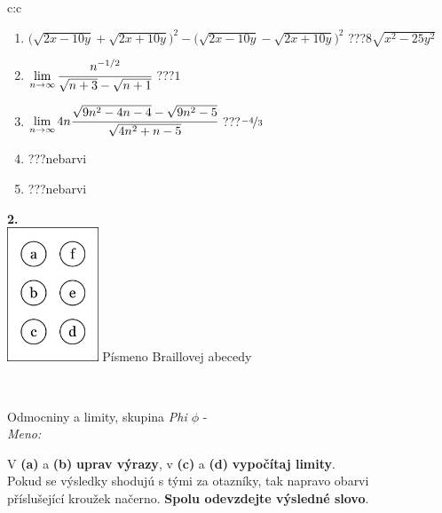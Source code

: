 \documentclass[10pt]{report}
\begin{document}
\begin{tabular}{c:c}
\begin{minipage}[c][104.5mm][t]{0.5\linewidth}
\begin{center}
\begin{minipage}{0.79\linewidth}
\begin{center}
\begin{varwidth}{\linewidth}
\begin{enumerate}
\item {\footnotesize{\scriptsize$\big(\sqrt{2x-10y}+\sqrt{2x+10y}\big)^2-\big(\sqrt{2x-10y}-\sqrt{2x+10y}\big)^2$}\quad \dotfill\; ???\;\dotfill \quad $8\sqrt{x^2-25y^2}$}
\item $\lim\limits_{n\to\infty}\cfrac{n^{-1/2}}{\sqrt{n+3}-\sqrt{n+1}}$\quad \dotfill\; ???\;\dotfill \quad $1$
\item $\lim\limits_{n\to\infty}4n\cfrac{\sqrt{9n^2-4n-4}-\sqrt{9n^2-5}}{\sqrt{4n^2+n-5}}$\quad \dotfill\; ???\;\dotfill \quad $\nicefrac{-4}{3}$
\item \quad \dotfill\; ???\;\dotfill \quad nebarvi
\item \quad \dotfill\; ???\;\dotfill \quad nebarvi
\end{enumerate}
\end{varwidth}
\end{center}
\end{minipage}
\begin{minipage}{0.20\linewidth}
\begin{center}
{\Huge\bfseries 2.} \\[2mm]
\includegraphics[height=40mm]{../images/braille.png}
{\small Písmeno Braillovej abecedy}
\end{center}
\end{minipage}
\end{center}
\end{minipage}
\\ \hdashline
\begin{minipage}[c][104.5mm][t]{0.5\linewidth}
\begin{center}
\vspace{7mm}
{\huge Odmocniny a limity, skupina \textit{Phi $\phi$} -}\\[5mm]
\textit{Meno:}\phantom{xxxxxxxxxxxxxxxxxxxxxxxxxxxxxxxxxxxxxxxxxxxxxxxxxxxxxxxxxxxxxxxxx}\\[5mm]
\begin{minipage}{0.95\linewidth}
\begin{center}
V \textbf{(a)} a \textbf{(b)} \textbf{uprav výrazy}, v \textbf{(c)} a \textbf{(d)} \textbf{vypočítaj limity}.\\Pokud se výsledky shodujú s tými za otazníky, tak napravo obarvi\\příslušející kroužek načerno. \textbf{Spolu odevzdejte výsledné slovo}.

\end{center}
\end{minipage}
\end{center}
\end{minipage}
\end{tabular}
\end{document}
